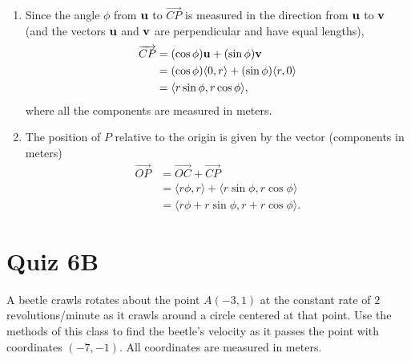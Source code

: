 \documentclass{ximera}
\begin{document}
\begin{question}
\begin{explanation}
\begin{enumerate}
\item Since the angle $\phi$ from ${\bf u}$ to $\overrightarrow{CP}$ is measured in the direction from ${\bf u}$ to ${\bf v}$ (and the vectors ${\bf u}$ and ${\bf v}$ are perpendicular and have equal lengths),
\begin{align*}
     \overrightarrow{CP} &= (\cos \phi) {\bf u} + (\sin \phi) {\bf v} \\
                                   &= (\cos \phi) \langle 0, r \rangle + (\sin \phi) \langle r, 0\rangle \\
                                   &= \langle r \sin \phi , r \cos \phi \rangle ,
\end{align*} 
where all the components are measured in meters.

\item The position of $P$ relative to the origin is given by the vector (components in meters)
\begin{align*}
    \overrightarrow{OP} &=  \overrightarrow{OC} +  \overrightarrow{CP} \\
                                  & =  \langle r \phi , r \rangle + \langle r \sin \phi , r \cos \phi \rangle \\
                                  & = \langle r\phi + r \sin \phi , r + r \cos \phi \rangle.
\end{align*}
\end{enumerate}

\end{explanation}
\end{question}


\section{Quiz 6B}
 A beetle crawls rotates about the point $A(-3,1)$ at the constant rate of $2$ revolutions/minute as it crawls around a circle centered at that point. Use the methods of this class to find the beetle's velocity as it passes the point with coordinates $(-7,-1)$. All coordinates are measured in meters.
\end{document}
